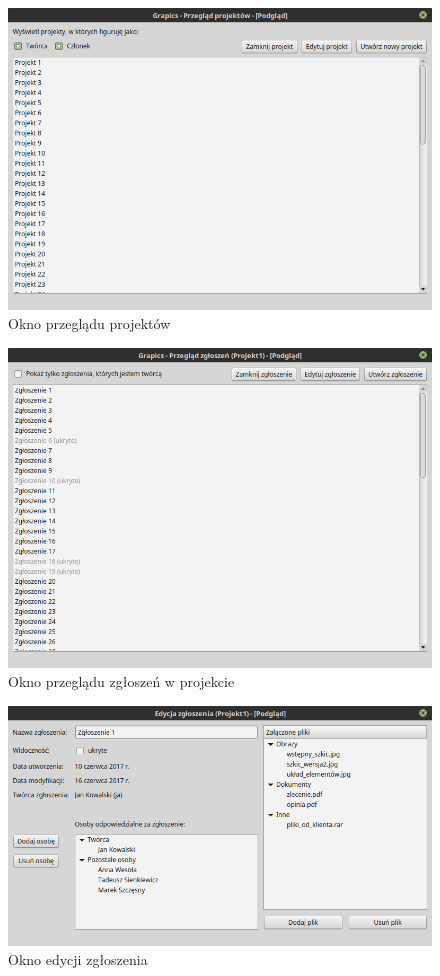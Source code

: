 \documentclass[12pt, oneside, final]{report}
\begin{document}
\begin{figure}[ht!]
	\centering
	\includegraphics[scale=\uiscale]{ui/projects.png}
	\caption{Okno przeglądu projektów}
\end{figure}
\begin{figure}[ht!]
	\centering
	\includegraphics[scale=\uiscale]{ui/issues.png}
	\caption{Okno przeglądu zgłoszeń w projekcie}
\end{figure}
\begin{figure}[ht!]
	\centering
	\includegraphics[scale=\uiscale]{ui/edit_issue.png}
	\caption{Okno edycji zgłoszenia}
\end{figure}
\end{document}
